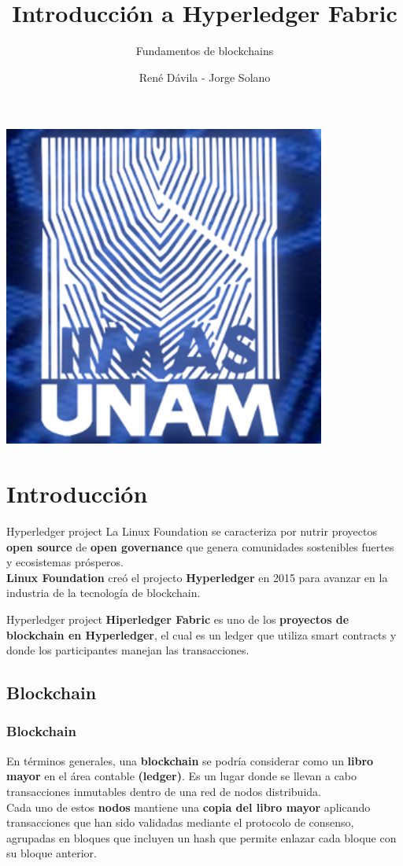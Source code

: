 \documentclass{beamer}
\title[]{Introducción a Hyperledger Fabric}
\subtitle{Fundamentos de blockchains}
\author{René Dávila - Jorge Solano}
\date{ }
\begin{document}
	\EnableBpAbbreviations
	
	\begin{frame}
		\begin{center}
			\includegraphics [width =0.2 \textwidth ]{iimas}
		\end{center}
		\titlepage 
	\end{frame}

	\section{Introducción}
	\begin{frame}
		\begin{block}{Hyperledger project}
			La Linux Foundation se caracteriza por nutrir proyectos \textbf{open source} de \textbf{open governance} que genera comunidades sostenibles fuertes y ecosistemas prósperos.\\
			\vspace{4mm}
			\textbf{Linux Foundation} creó el projecto \textbf{Hyperledger} en 2015 para avanzar en la industria de la tecnología de blockchain.
		\end{block}
	\end{frame}

	\begin{frame}
		\begin{block}{Hyperledger project}
			\textbf{Hiperledger Fabric} es uno de los \textbf{proyectos de blockchain en Hyperledger}, el cual es un ledger que utiliza smart contracts y donde los participantes manejan las transacciones.
		\end{block}
	\end{frame}

	\subsection{Blockchain}
	\begin{frame}
		\frametitle{Blockchain}
		En términos generales, una \textbf{blockchain} se podría considerar como un \textbf{libro mayor} en el área contable \textbf{(ledger)}. Es un lugar donde se llevan a cabo transacciones inmutables dentro de una red de nodos distribuida.\\
		\vspace{4mm}
		Cada uno de estos \textbf{nodos} mantiene una \textbf{copia del libro mayor} aplicando transacciones que han sido validadas mediante el protocolo de consenso, agrupadas en bloques que incluyen un hash que permite enlazar cada bloque con su bloque anterior.
	\end{frame}
	
\end{document}
